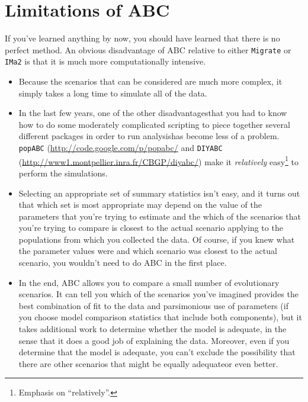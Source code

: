 \section*{Limitations of ABC}

If you've learned anything by now, you should have learned that there
is no perfect method. An obvious disadvantage of ABC relative to
either {\tt Migrate} or {\tt IMa2} is that it is much more
computationally intensive. 

\begin{itemize}

\item Because the scenarios that can be considered are much more
  complex, it simply takes a long time to simulate all of the data. 

\item In the last few years, one of the other disadvantages{\dash}that
  you had to know how to do some moderately complicated scripting to
  piece together several different packages in order to run
  analysis{\dash}has become less of a problem. {\tt popABC}
  (\url{http://code.google.com/p/popabc/} and {\tt DIYABC}
  (\url{http://www1.montpellier.inra.fr/CBGP/diyabc/}) make it {\it
    relatively\/} easy\footnote{Emphasis on ``relatively''.} to
  perform the simulations.

\item Selecting an appropriate set of summary statistics isn't easy,
  and it turns out that which set is most appropriate may depend on
  the value of the parameters that you're trying to estimate and the
  which of the scenarios that you're trying to compare is closest to
  the actual scenario applying to the populations from which you
  collected the data. Of course, if you knew what the parameter values
  were and which scenario was closest to the actual scenario, you
  wouldn't need to do ABC in the first place.

\item In the end, ABC allows you to compare a small number of
  evolutionary scenarios. It can tell you which of the scenarios
  you've imagined provides the best combination of fit to the data and
  parsimonious use of parameters (if you choose model comparison
  statistics that include both components), but it takes additional
  work to determine whether the model is adequate, in the sense that
  it does a good job of explaining the data. Moreover, even if you
  determine that the model is adequate, you can't exclude the
  possibility that there are other scenarios that might be equally
  adequate{\dash}or even better.

\end{itemize}

